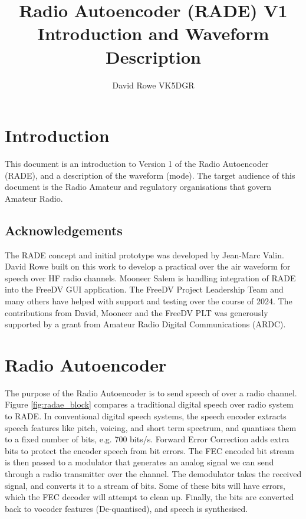 \documentclass{article}
\begin{document}


\title{Radio Autoencoder (RADE) V1 Introduction and Waveform Description}
\author{David Rowe VK5DGR}
\date{}
\maketitle

\section{Introduction}

This document is an introduction to Version 1 of the Radio Autoencoder (RADE), and a description of the waveform (mode). The target audience of this document is the Radio Amateur and regulatory organisations that govern Amateur Radio.

\subsection{Acknowledgements}

The RADE concept and initial prototype was developed by Jean-Marc Valin. David Rowe built on this work to develop a practical over the air waveform for speech over HF radio channels.  Mooneer Salem is handling integration of RADE into the FreeDV GUI application. The FreeDV Project Leadership Team and many others have helped with support and testing over the course of 2024. The contributions from David, Mooneer and the FreeDV PLT was generously supported by a grant from Amateur Radio Digital Communications (ARDC).

\section{Radio Autoencoder}

The purpose of the Radio Autoencoder is to send speech of over a radio channel. 
Figure \ref{fig:radae_block} compares a traditional digital speech over radio system to RADE.
In conventional digital speech systems, the speech encoder extracts speech features like pitch, voicing, and short term spectrum, and quantises them to a fixed number of bits, e.g. 700 bits/s.  Forward Error Correction adds extra bits to protect the encoder speech from bit errors.  The FEC encoded bit stream is then passed to a modulator that generates an analog signal we can send through a radio transmitter over the channel.  The demodulator takes the received signal, and converts it to a stream of bits.  Some of these bits will have errors, which the FEC decoder will attempt to clean up.  Finally, the bits are converted back to vocoder features (De-quantised), and speech is synthesised.
\end{document}
